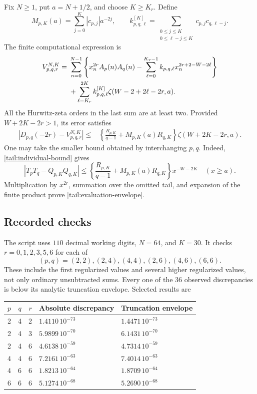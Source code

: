 \documentclass[11pt,a4paper]{article}
\numberwithin{equation}{section}
\theoremstyle{definition}
\theoremstyle{remark}
\begin{document}
Fix \(N\ge1\), put \(a=N+1/2\), and choose \(K\ge K_r\).
Define
\[
 M_{p,K}(a)=\sum_{j=0}^{K}|c_{p,j}|a^{-2j},\qquad
 k_{p,q,\ell}^{[K]}
   =\sum_{\substack{0\le j\le K\\0\le\ell-j\le K}}
                         c_{p,j}c_{q,\ell-j}.
\]
The finite computational expression is
\begin{align}\label{tail:finite-evaluation}
 V_{p,q,r}^{N,K}={}&
 \sum_{n=0}^{N-1}\left\{x_n^{2r}A_p(n)A_q(n)
     -\sum_{\ell=0}^{K_r-1}
            k_{p,q,\ell}x_n^{2r+2-W-2\ell}\right\}\notag\\
 &+\sum_{\ell=K_r}^{2K}
       k_{p,q,\ell}^{[K]}\zeta(W-2+2\ell-2r,a).
\end{align}
All the Hurwitz-zeta orders in the last sum are at least two.
Provided \(W+2K-2r>1\), its error satisfies
\begin{align}\label{tail:evaluation-envelope}
 |D_{p,q}(-2r)-V_{p,q,r}^{N,K}|
 \le{}&\left\{\frac{R_{p,K}}{q-1}
                   +M_{p,K}(a)R_{q,K}\right\}
                     \zeta(W+2K-2r,a).
\end{align}
One may take the smaller bound obtained by interchanging \(p,q\).
Indeed, \eqref{tail:individual-bound} gives
\[
 |T_pT_q-Q_{p,K}Q_{q,K}|
 \le\left\{\frac{R_{p,K}}{q-1}
                   +M_{p,K}(a)R_{q,K}\right\}x^{-W-2K}
 \quad(x\ge a).
\]
Multiplication by \(x^{2r}\), summation over the omitted tail,
and expansion of the finite product prove
\eqref{tail:evaluation-envelope}.

\subsection{Recorded checks}

The script uses \(110\) decimal working digits, \(N=64\), and
\(K=30\). It checks \(r=0,1,2,3,5,6\) for each of
\[
 (p,q)=(2,2),(2,4),(4,4),(2,6),(4,6),(6,6).
\]
These include the first regularized values and several higher
regularized values, not only ordinary unsubtracted sums.
Every one of the \(36\) observed discrepancies is below its
analytic truncation envelope. Selected results are
\begin{center}
\begin{tabular}{cccll}
\hline
\(p\)&\(q\)&\(r\)&Absolute discrepancy&Truncation envelope\\
\hline
2&4&2&\(1.4110\,10^{-73}\)&\(1.4471\,10^{-73}\)\\
2&4&3&\(5.9899\,10^{-70}\)&\(6.1431\,10^{-70}\)\\
2&4&6&\(4.6138\,10^{-59}\)&\(4.7314\,10^{-59}\)\\
4&4&6&\(7.2161\,10^{-63}\)&\(7.4014\,10^{-63}\)\\
4&6&6&\(1.8213\,10^{-64}\)&\(1.8709\,10^{-64}\)\\
6&6&6&\(5.1274\,10^{-68}\)&\(5.2690\,10^{-68}\)\\
\hline
\end{tabular}
\end{center}
\end{document}
